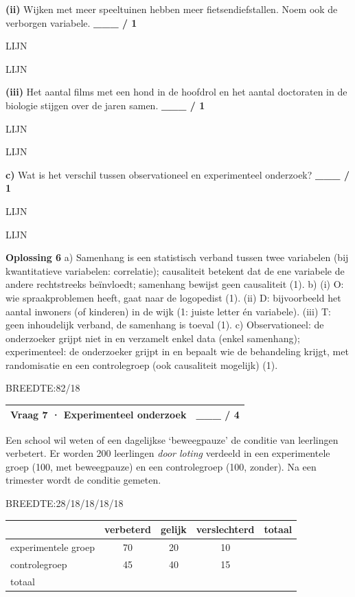 \documentclass{article}
\newcommand{\lijn}{\par LIJN\par}
\newcommand{\breedtes}[1]{\par BREEDTE:#1\par}
\begin{document}
\textbf{(ii)} Wijken met meer speeltuinen hebben meer fietsendiefstallen. Noem ook de verborgen variabele. \hfill \textbf{\_\_\_ / 1} \lijn \lijn 

\textbf{(iii)} Het aantal films met een hond in de hoofdrol en het aantal doctoraten in de biologie stijgen over de jaren samen. \hfill \textbf{\_\_\_ / 1} \lijn \lijn 

\textbf{c)} Wat is het verschil tussen observationeel en experimenteel onderzoek? \hfill \textbf{\_\_\_ / 1} \lijn \lijn 

\begin{oplossing}
\textbf{Oplossing 6} \quad a) Samenhang is een statistisch verband tussen twee variabelen (bij kwantitatieve variabelen: correlatie); causaliteit betekent dat de ene variabele de andere rechtstreeks beïnvloedt; samenhang bewijst geen causaliteit (1). b) (i) O: wie spraakproblemen heeft, gaat naar de logopedist (1). (ii) D: bijvoorbeeld het aantal inwoners (of kinderen) in de wijk (1: juiste letter én variabele). (iii) T: geen inhoudelijk verband, de samenhang is toeval (1). c) Observationeel: de onderzoeker grijpt niet in en verzamelt enkel data (enkel samenhang); experimenteel: de onderzoeker grijpt in en bepaalt wie de behandeling krijgt, met randomisatie en een controlegroep (ook causaliteit mogelijk) (1).
\end{oplossing}

\breedtes{82/18}
\begin{tabular}{lc}
\hline
Vraag 7 · Experimenteel onderzoek & \_\_\_ / 4 \\
\hline
\end{tabular}

Een school wil weten of een dagelijkse ‘beweegpauze’ de conditie van leerlingen verbetert. Er worden 200 leerlingen \emph{door loting} verdeeld in een experimentele groep (100, met beweegpauze) en een controlegroep (100, zonder). Na een trimester wordt de conditie gemeten.

\breedtes{28/18/18/18/18}
\begin{tabular}{lcccc}
\hline
 & verbeterd & gelijk & verslechterd & totaal \\
\hline
experimentele groep & 70 & 20 & 10 & \\
controlegroep & 45 & 40 & 15 & \\
totaal & & & & \\
\hline
\end{tabular}
\end{document}
